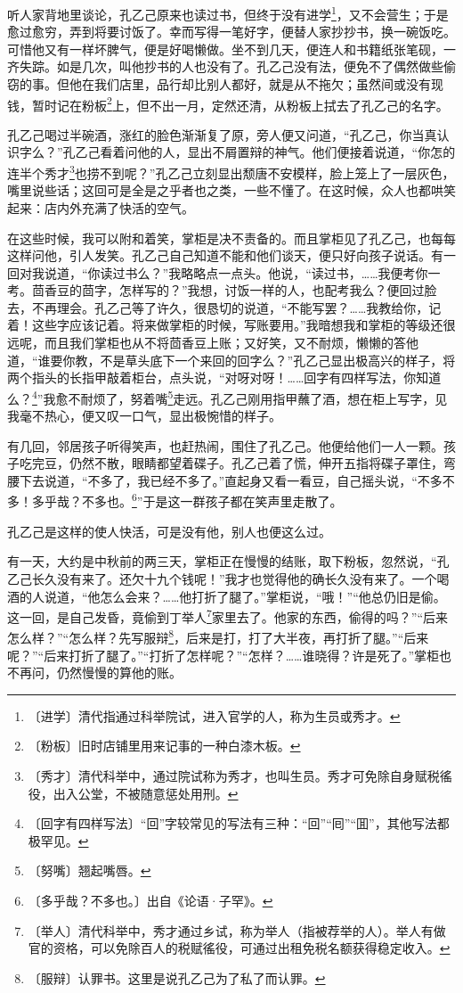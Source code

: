 \documentclass[12pt,UTF-8,openany]{ctexbook}
\begin{document}
\begin{normalsize}
    听人家背地里谈论，孔乙己原来也读过书，但终于没有进学\footnote{〔进学〕清代指通过科举院试，进入官学的人，称为生员或秀才。}，又不会营生；于是愈过愈穷，弄到将要讨饭了。幸而写得一笔好字，便替人家抄抄书，换一碗饭吃。可惜他又有一样坏脾气，便是好喝懒做。坐不到几天，便连人和书籍纸张笔砚，一齐失踪。如是几次，叫他抄书的人也没有了。孔乙己没有法，便免不了偶然做些偷窃的事。但他在我们店里，品行却比别人都好，就是从不拖欠；虽然间或没有现钱，暂时记在粉板\footnote{〔粉板〕旧时店铺里用来记事的一种白漆木板。}上，但不出一月，定然还清，从粉板上拭去了孔乙己的名字。
    
    孔乙己喝过半碗酒，涨红的脸色渐渐复了原，旁人便又问道，“孔乙己，你当真认识字么？”孔乙己看着问他的人，显出不屑置辩的神气。他们便接着说道，“你怎的连半个秀才\footnote{〔秀才〕清代科举中，通过院试称为秀才，也叫生员。秀才可免除自身赋税徭役，出入公堂，不被随意惩处用刑。}也捞不到呢？”孔乙己立刻显出颓唐不安模样，脸上笼上了一层灰色，嘴里说些话；这回可是全是之乎者也之类，一些不懂了。在这时候，众人也都哄笑起来：店内外充满了快活的空气。
    
    在这些时候，我可以附和着笑，掌柜是决不责备的。而且掌柜见了孔乙己，也每每这样问他，引人发笑。孔乙己自己知道不能和他们谈天，便只好向孩子说话。有一回对我说道，“你读过书么？”我略略点一点头。他说，“读过书，……我便考你一考。茴香豆的茴字，怎样写的？”我想，讨饭一样的人，也配考我么？便回过脸去，不再理会。孔乙己等了许久，很恳切的说道，“不能写罢？……我教给你，记着！这些字应该记着。将来做掌柜的时候，写账要用。”我暗想我和掌柜的等级还很远呢，而且我们掌柜也从不将茴香豆上账；又好笑，又不耐烦，懒懒的答他道，“谁要你教，不是草头底下一个来回的回字么？”孔乙己显出极高兴的样子，将两个指头的长指甲敲着柜台，点头说，“对呀对呀！……回字有四样写法，你知道么？\footnote{〔回字有四样写法〕“回”字较常见的写法有三种：“回”“囘”“囬”，其他写法都极罕见。}”我愈不耐烦了，努着嘴\footnote{〔努嘴〕翘起嘴唇。}走远。孔乙己刚用指甲蘸了酒，想在柜上写字，见我毫不热心，便又叹一口气，显出极惋惜的样子。
    
    有几回，邻居孩子听得笑声，也赶热闹，围住了孔乙己。他便给他们一人一颗。孩子吃完豆，仍然不散，眼睛都望着碟子。孔乙己着了慌，伸开五指将碟子罩住，弯腰下去说道，“不多了，我已经不多了。”直起身又看一看豆，自己摇头说，“不多不多！多乎哉？不多也。\footnote{〔多乎哉？不多也。〕出自《论语·子罕》。}”于是这一群孩子都在笑声里走散了。
    
    孔乙己是这样的使人快活，可是没有他，别人也便这么过。
    
    有一天，大约是中秋前的两三天，掌柜正在慢慢的结账，取下粉板，忽然说，“孔乙己长久没有来了。还欠十九个钱呢！”我才也觉得他的确长久没有来了。一个喝酒的人说道，“他怎么会来？……他打折了腿了。”掌柜说，“哦！”“他总仍旧是偷。这一回，是自己发昏，竟偷到丁举人\footnote{〔举人〕清代科举中，秀才通过乡试，称为举人（指被荐举的人）。举人有做官的资格，可以免除百人的税赋徭役，可通过出租免税名额获得稳定收入。}家里去了。他家的东西，偷得的吗？”“后来怎么样？”“怎么样？先写服辩\footnote{〔服辩〕认罪书。这里是说孔乙己为了私了而认罪。}，后来是打，打了大半夜，再打折了腿。”“后来呢？”“后来打折了腿了。”“打折了怎样呢？”“怎样？……谁晓得？许是死了。”掌柜也不再问，仍然慢慢的算他的账。
    

\end{normalsize}
\end{document}
